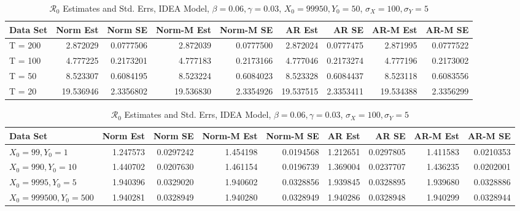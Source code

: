 \documentclass[12pt]{article}
\newcommand{\rr}{\ensuremath{\mathcal{R}_0}}
\begin{document}
\begin{table}[H]
	
	\caption{\label{tab:}$\rr$ Estimates and Std. Errs, IDEA Model,
		$\beta = 0.06, \gamma = 0.03$, $X_0 = 99950, Y_0 = 50$, $\sigma_X = 100, \sigma_Y = 5$}
	\centering
	\begin{tabular}[t]{l|r|r|r|r|r|r|r|r}
		\hline
		Data Set & Norm Est & Norm SE & Norm-M Est & Norm-M SE & AR Est & AR SE & AR-M Est & AR-M SE\\
		\hline
		T = 200 & 2.872029 & 0.0777506 & 2.872039 & 0.0777500 & 2.872024 & 0.0777475 & 2.871995 & 0.0777522\\
		\hline
		T = 100 & 4.777225 & 0.2173201 & 4.777183 & 0.2173166 & 4.777046 & 0.2173274 & 4.777196 & 0.2173002\\
		\hline
		T = 50 & 8.523307 & 0.6084195 & 8.523224 & 0.6084023 & 8.523328 & 0.6084437 & 8.523118 & 0.6083556\\
		\hline
		T = 20 & 19.536946 & 2.3356802 & 19.536830 & 2.3354926 & 19.537515 & 2.3353411 & 19.534388 & 2.3356299\\
		\hline
	\end{tabular}
\end{table}

\begin{table}[h]
	
	\caption{\label{tab:}$\rr$ Estimates and Std. Errs, IDEA Model,
		$\beta = 0.06, \gamma = 0.03$, $\sigma_X = 100, \sigma_Y = 5$}
	\centering
	\begin{tabular}[t]{l|r|r|r|r|r|r|r|r}
		\hline
		Data Set & Norm Est & Norm SE & Norm-M Est & Norm-M SE & AR Est & AR SE & AR-M Est & AR-M SE\\
		\hline
		$X_0 = 99, Y_0 = 1$ & 1.247573 & 0.0297242 & 1.454198 & 0.0194568 & 1.212651 & 0.0297805 & 1.411583 & 0.0210353\\
		\hline
		$X_0 = 990, Y_0 = 10$ & 1.440702 & 0.0207630 & 1.461154 & 0.0196739 & 1.369004 & 0.0237707 & 1.436235 & 0.0202001\\
		\hline
		$X_0 = 9995, Y_0 = 5$ & 1.940396 & 0.0329020 & 1.940602 & 0.0328856 & 1.939845 & 0.0328895 & 1.939680 & 0.0328886\\
		\hline
		$X_0 = 999500, Y_0 = 500$ & 1.940281 & 0.0328949 & 1.940280 & 0.0328949 & 1.940286 & 0.0328948 & 1.940299 & 0.0328944\\
		\hline
	\end{tabular}
\end{table}
\end{document}

